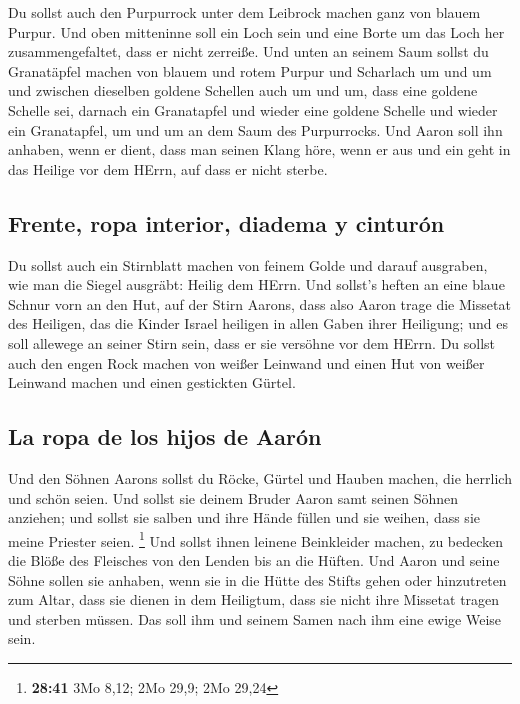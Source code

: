  Du sollst auch den Purpurrock unter dem Leibrock machen
ganz von blauem Purpur.  Und oben mitteninne soll ein
Loch sein und eine Borte um das Loch her zusammengefaltet, dass er nicht
zerreiße.  Und unten an seinem Saum sollst du Granatäpfel
machen von blauem und rotem Purpur und Scharlach um und um und zwischen
dieselben goldene Schellen auch um und um,  dass eine
goldene Schelle sei, darnach ein Granatapfel und wieder eine goldene
Schelle und wieder ein Granatapfel, um und um an dem Saum des
Purpurrocks.  Und Aaron soll ihn anhaben, wenn er dient,
dass man seinen Klang höre, wenn er aus und ein geht in das Heilige vor
dem HErrn, auf dass er nicht sterbe.

\hypertarget{frente-ropa-interior-diadema-y-cinturuxf3n}{%
\subsection{Frente, ropa interior, diadema y
cinturón}\label{frente-ropa-interior-diadema-y-cinturuxf3n}}

 Du sollst auch ein Stirnblatt machen von feinem Golde
und darauf ausgraben, wie man die Siegel ausgräbt: Heilig dem HErrn.
 Und sollst's heften an eine blaue Schnur vorn an den
Hut,  auf der Stirn Aarons, dass also Aaron trage die
Missetat des Heiligen, das die Kinder Israel heiligen in allen Gaben
ihrer Heiligung; und es soll allewege an seiner Stirn sein, dass er sie
versöhne vor dem HErrn.  Du sollst auch den engen Rock
machen von weißer Leinwand und einen Hut von weißer Leinwand machen und
einen gestickten Gürtel.

\hypertarget{la-ropa-de-los-hijos-de-aaruxf3n}{%
\subsection{La ropa de los hijos de
Aarón}\label{la-ropa-de-los-hijos-de-aaruxf3n}}

 Und den Söhnen Aarons sollst du Röcke, Gürtel und Hauben
machen, die herrlich und schön seien.  Und sollst sie
deinem Bruder Aaron samt seinen Söhnen anziehen; und sollst sie salben
und ihre Hände füllen und sie weihen, dass sie meine Priester seien.
\footnote{\textbf{28:41} 3Mo 8,12; 2Mo 29,9; 2Mo 29,24} 
Und sollst ihnen leinene Beinkleider machen, zu bedecken die Blöße des
Fleisches von den Lenden bis an die Hüften.  Und Aaron
und seine Söhne sollen sie anhaben, wenn sie in die Hütte des Stifts
gehen oder hinzutreten zum Altar, dass sie dienen in dem Heiligtum, dass
sie nicht ihre Missetat tragen und sterben müssen. Das soll ihm und
seinem Samen nach ihm eine ewige Weise sein.

